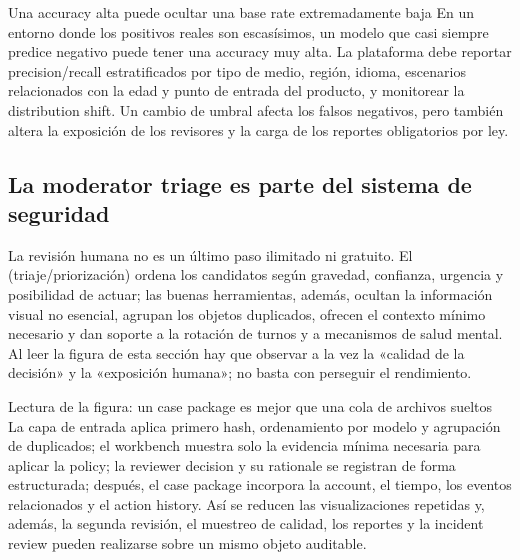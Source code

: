 \begin{warningbox}{Una accuracy alta puede ocultar una base rate extremadamente baja}
En un entorno donde los positivos reales son escasísimos, un modelo que casi siempre predice negativo puede tener una accuracy muy alta. La plataforma debe reportar precision/recall estratificados por tipo de medio, región, idioma, escenarios relacionados con la edad y punto de entrada del producto, y monitorear la distribution shift. Un cambio de umbral afecta los falsos negativos, pero también altera la exposición de los revisores y la carga de los reportes obligatorios por ley.
\end{warningbox}

\subsection{La moderator triage es parte del sistema de seguridad}

La revisión humana no es un último paso ilimitado ni gratuito. El  (triaje/priorización) ordena los candidatos según gravedad, confianza, urgencia y posibilidad de actuar; las buenas herramientas, además, ocultan la información visual no esencial, agrupan los objetos duplicados, ofrecen el contexto mínimo necesario y dan soporte a la rotación de turnos y a mecanismos de salud mental. Al leer la figura de esta sección hay que observar a la vez la «calidad de la decisión» y la «exposición humana»; no basta con perseguir el rendimiento.


\begin{knowledgebox}{Lectura de la figura: un case package es mejor que una cola de archivos sueltos}
La capa de entrada aplica primero hash, ordenamiento por modelo y agrupación de duplicados; el workbench muestra solo la evidencia mínima necesaria para aplicar la policy; la reviewer decision y su rationale se registran de forma estructurada; después, el case package incorpora la account, el tiempo, los eventos relacionados y el action history. Así se reducen las visualizaciones repetidas y, además, la segunda revisión, el muestreo de calidad, los reportes y la incident review pueden realizarse sobre un mismo objeto auditable.
\end{knowledgebox}

